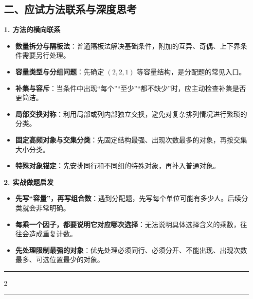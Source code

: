\documentclass[11pt,a4paper]{ctexart}
\begin{document}
\subsection*{二、应试方法联系与深度思考}

\textbf{1. 方法的横向联系}
\begin{itemize}[itemsep=0.3em]
    \item \textbf{数量拆分与隔板法}：普通隔板法解决基础条件，附加的互异、奇偶、上下界条件需要另行处理。
    \item \textbf{容量类型与分组问题}：先确定 $(2,2,1)$ 等容量结构，是分配题的常见入口。
    \item \textbf{补集与容斥}：当条件中出现“每个”“至少”“都不缺少”时，应主动检查补集是否更简洁。
    \item \textbf{局部交换对称}：利用局部或列内部独立交换，避免对复杂排列情况进行繁琐的分类。
    \item \textbf{固定高频对象与交集分类}：先固定结构最强、出现次数最多的对象，再按交集大小分类。
    \item \textbf{特殊对象锚定}：先安排同行和不同组的特殊对象，再补入普通对象。
\end{itemize}

\textbf{2. 实战做题启发}
\begin{itemize}[itemsep=0.3em]
    \item \textbf{先写“容量”，再写组合数}：遇到分配题，先写每个单位可能有多少人。后续分类就会非常明确。
    \item \textbf{每乘一个因子，都要说明它对应哪次选择}：无法说明具体选择含义的乘数，往往会造成重复计数。
    \item \textbf{先处理限制最强的对象}：优先处理必须同行、必须分开、不能出现、出现次数最多、可选位置最少的对象。
\end{itemize}

\vspace{1em}
\hrule
\vspace{1.5em}

{\small \qProbPermDiffBoxesStem}
\vspace{0.5em}
\begin{paracol}{2}
\switchcolumn
{}
\end{paracol}

\vspace{1.5em}
\hrule
\vspace{1.5em}
\end{document}
